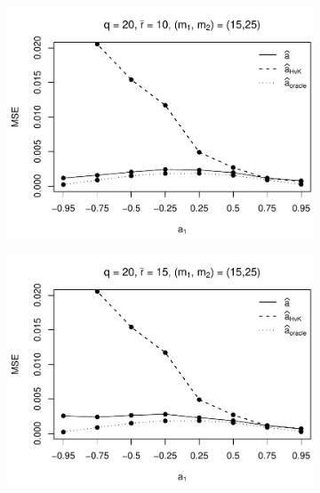 \begin{figure}[p]
\begin{subfigure}[b]{0.45\textwidth}
\includegraphics[width=\textwidth]{Plots/Robustness/MSE_a1_zoomed_T=500_slope=10_(q,r,M1,M2)=(20,10,15,25).pdf}
\end{subfigure}
\hspace{0.25cm}
\begin{subfigure}[b]{0.45\textwidth}
\includegraphics[width=\textwidth]{Plots/Robustness/MSE_a1_zoomed_T=500_slope=10_(q,r,M1,M2)=(20,15,15,25).pdf}
\end{subfigure}


\end{figure}
